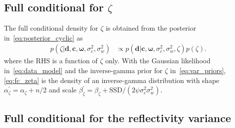 \documentclass[12pt]{article}
\begin{document}
\subsection{Full conditional for \texorpdfstring{$\zeta$}{zeta}} \label{sec:fc_zeta}

The full conditional density for $\zeta$ is obtained from the posterior in~\eqref{eq:posterior_cyclic} as
\begin{equation} \label{eq:fc_zeta}
\begin{split}
    p(\zeta| \bm{d}, \bm{c}, \bm{\omega}, \sigma_c^2, \sigma_w^2) &\propto p(\bm{d}| \bm{c}, \bm{\omega}, \sigma_c^2, \sigma_w^2, \zeta) p(\zeta).
\end{split}
\end{equation}
where the RHS is a function of $\zeta$ only.
With the Gaussian likelihood in~\eqref{eq:data_model} and the inverse-gamma prior for $\zeta$ in~\eqref{eq:var_priors}, \eqref{eq:fc_zeta} is the density of an inverse-gamma distribution with shape $\alpha_{\zeta}^{\prime} = \alpha_{\zeta} + n/2$ and scale 
$\beta_{\zeta}^{\prime} = \beta_{\zeta} + \mbox{SSD}/(2 \psi \sigma_c^2 \sigma_w^2)$.



\subsection{Full conditional for the reflectivity variance} \label{sec:fc_sigmac}
\end{document}
